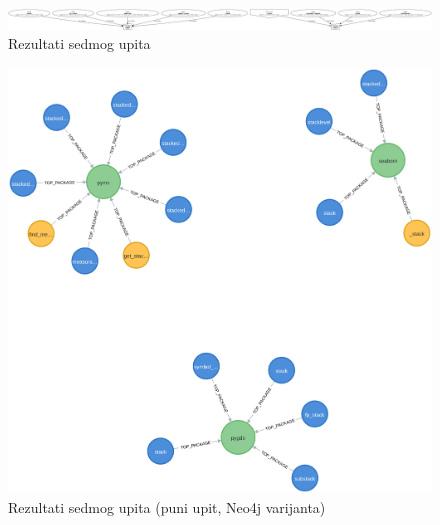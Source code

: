 \begin{figure}
    \includegraphics[scale=0.12, angle=90]{assets/stack.png}
    \centering
    \caption{Rezultati sedmog upita}
    \label{fig:upit7}
\end{figure}


\begin{figure}
    \includegraphics[scale=0.3]{assets/stack2.png}
    \centering
    \caption{Rezultati sedmog upita (puni upit, Neo4j varijanta)}
    \label{fig:upit72}
\end{figure}

